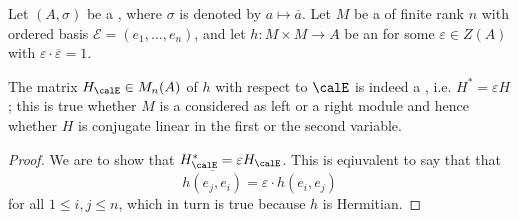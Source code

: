\begin{lemma} \label{lemma:matrix_of_a_varepsilon_hermitian_form_over_a_ring_with_involution_is_a_varepsilon_hermitian_matrix}
    Let $(A,\sigma)$ be a , where $\sigma$ is denoted by $a \mapsto \overline{a}$. Let $M$ be a  of finite rank $n$ with ordered basis $\mathcal{E} = (e_1,\ldots,e_n)$, and let $h: M \times M \to A$ be an  for some $\varepsilon \in Z(A)$ with $\varepsilon \cdot \overline{\varepsilon} = 1$.

    The matrix $H_\calE \in M_n(A)$ of $h$ with respect to $\calE$ is indeed a , i.e. $H^* = \varepsilon H$; this is true whether $M$ is a considered as left or a right module and hence whether $H$ is conjugate linear in the first or the second variable.
\end{lemma}
\begin{proof}
    We are to show that $H_\calE^* = \varepsilon H_\calE$. This is eqiuvalent to say that that 
    $$\overline{h(e_j,e_i)} = \varepsilon \cdot h(e_i,e_j)$$
    for all $1 \leq i,j \leq n$, which in turn is true because $h$ is Hermitian. 
\end{proof}